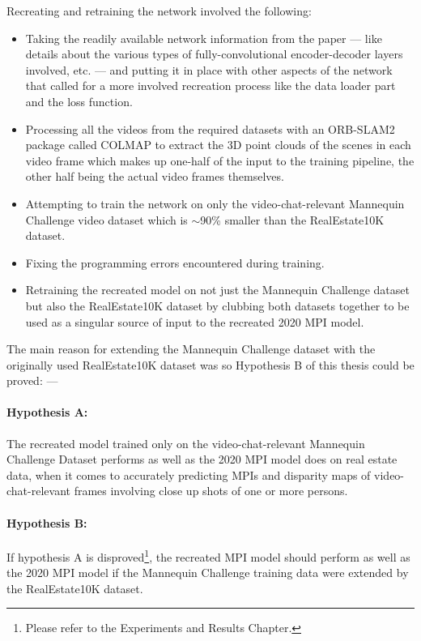 Recreating and retraining the network involved the following:
\begin{itemize}
    \item Taking the readily available network information from the paper --- like details about the various types of fully-convolutional encoder-decoder layers involved, etc. --- and putting it in place with other aspects of the network that called for a more involved recreation process like the data loader part and the loss function.
    \item Processing all the videos from the required datasets with an ORB-SLAM2 package called COLMAP to extract the 3D point clouds of the scenes in each video frame which makes up one-half of the input to the training pipeline, the other half being the actual video frames themselves.
    \item Attempting to train the network on only the video-chat-relevant Mannequin Challenge video dataset \cite{li2019learning} which is $\sim$90\% smaller than the RealEstate10K dataset.
    \item Fixing the programming errors encountered during training.
    \item Retraining the recreated model on not just the Mannequin Challenge dataset but also the RealEstate10K dataset by clubbing both datasets together to be used as a singular source of input to the recreated 2020 MPI model.
\end{itemize}

The main reason for extending the Mannequin Challenge dataset with the originally used RealEstate10K dataset was so Hypothesis B of this thesis could be proved: ---

\paragraph{Hypothesis A:}
The recreated model trained only on the video-chat-relevant Mannequin Challenge Dataset performs as well as the 2020 MPI model does on real estate data, when it comes to accurately predicting MPIs and disparity maps of video-chat-relevant frames involving close up shots of one or more persons.

\paragraph{Hypothesis B:}
If hypothesis A is disproved\footnote{Please refer to the Experiments and Results Chapter.}, the recreated MPI model should perform as well as the 2020 MPI model if the Mannequin Challenge training data were extended by the RealEstate10K dataset.




